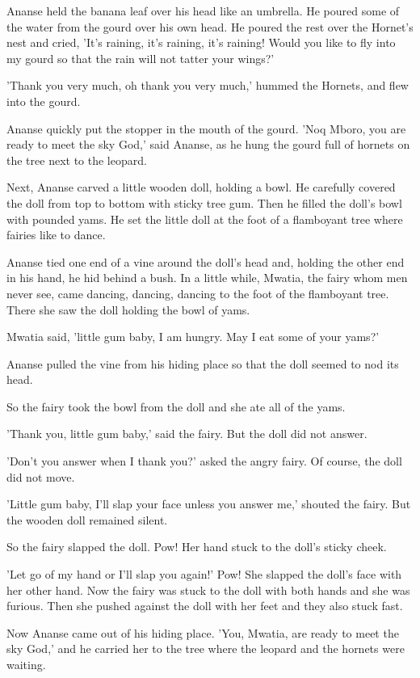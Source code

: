 Ananse held the banana leaf over his head like an umbrella. He poured some of the water from the gourd over his own head. He poured the rest over the Hornet's nest and cried, 'It's raining, it's raining, it's raining! Would you like to fly into my gourd so that the rain will not tatter your wings?'

'Thank you very much, oh thank you very much,' hummed the Hornets, and flew into the gourd.

Ananse quickly put the stopper in the mouth of the gourd. 'Noq Mboro, you are ready to meet the sky God,' said Ananse, as he hung the gourd full of hornets on the tree next to the leopard.

Next, Ananse carved a little wooden doll, holding a bowl. He carefully covered the doll from top to bottom with sticky tree gum. Then he filled the doll's bowl with pounded yams. He set the little doll at the foot of a flamboyant tree where fairies like to dance.

Ananse tied one end of a vine around the doll's head and, holding the other end in his hand, he hid behind a bush. In a little while, Mwatia, the fairy whom men never see, came dancing, dancing, dancing to the foot of the flamboyant tree. There she saw the doll holding the bowl of yams.

Mwatia said, 'little gum baby, I am hungry. May I eat some of your yams?'

Ananse pulled the vine from his hiding place so that the doll seemed to nod its head.

So the fairy took the bowl from the doll and she ate all of the yams.

'Thank you, little gum baby,' said the fairy. But the doll did not answer.

'Don't you answer when I thank you?' asked the angry fairy. Of course, the doll did not move.

'Little gum baby, I'll slap your face unless you answer me,' shouted the fairy. But the wooden doll remained silent.

So the fairy slapped the doll. Pow! Her hand stuck to the doll's sticky cheek.

'Let go of my hand or I'll slap you again!' Pow! She slapped the doll's face with her other hand. Now the fairy was stuck to the doll with both hands and she was furious. Then she pushed against the doll with her feet and they also stuck fast.

Now Ananse came out of his hiding place. 'You, Mwatia, are ready to meet the sky God,' and he carried her to the tree where the leopard and the hornets were waiting.

